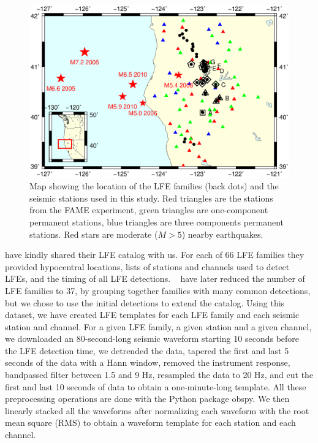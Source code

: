 \documentclass[draft]{agujournal2019}
\begin{document}
\begin{figure}
\noindent\includegraphics[width=\textwidth, trim={1.5cm 4cm 1cm 10cm},clip]{figures/map_LFEs.eps}
\caption{Map showing the location of the LFE families (back dots) and the seismic stations used in this study. Red triangles are the stations from the FAME experiment, green triangles are one-component permanent stations, blue triangles are three components permanent stations. Red stars are moderate ($M > 5$) nearby earthquakes.}
\label{pngfiguresample}
\end{figure}

 have kindly shared their LFE catalog with us. For each of 66 LFE families they provided hypocentral locations, lists of stations and channels used to detect LFEs, and the timing of all LFE detections. ~ have later reduced the number of LFE families to 37, by grouping together families with many common detections, but we chose to use the initial detections to extend the catalog. Using this dataset, we have created LFE templates for each LFE family and each seismic station and channel. For a given LFE family, a given station and a given channel, we downloaded an 80-second-long seismic waveform starting 10 seconds before the LFE detection time, we detrended the data, tapered the first and last 5 seconds of the data with a Hann window, removed the instrument response, bandpassed filter between 1.5 and 9 Hz, resampled the data to 20 Hz, and cut the first and last 10 seconds of data to obtain a one-minute-long template. All these preprocessing operations are done with the Python package obspy. We then linearly stacked all the waveforms after normalizing each waveform with the root mean square (RMS) to obtain a waveform template for each station and each channel.
\end{document}
